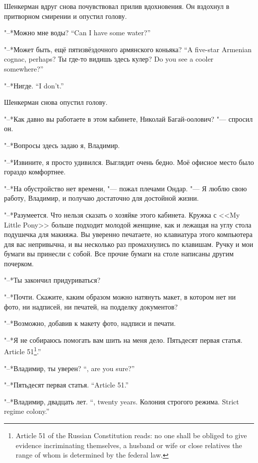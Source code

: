 Шенкерман вдруг снова почувствовал прилив вдохновения.
Он вздохнул в притворном смирении и опустил голову.

{"--*Можно мне воды?}
{``Can I have some water?''}

{"--*Может быть, ещё пятизвёздочного армянского коньяка?}
{``A five-star Armenian cognac, perhaps?}
{Ты где-то видишь здесь кулер?}
{Do you see a cooler somewhere?''}

{"--*Нигде.}
{``I don't.''}

Шенкерман снова опустил голову.

"--*Как давно вы работаете в этом кабинете, Николай Багай-оолович? "--- спросил он.

"--*Вопросы здесь задаю я, Владимир.

"--*Извините, я просто удивился.
Выглядит очень бедно.
Моё офисное место было гораздо комфортнее.

"--*На обустройство нет времени, "--- пожал плечами Ондар.
"--- Я люблю свою работу, Владимир, и получаю достаточно для достойной жизни.

"--*Разумеется.
Что нельзя сказать о хозяйке этого кабинета.
Кружка с <<My Little Pony>> больше подходит молодой женщине, как и лежащая на углу стола подушечка для макияжа.
Вы уверенно печатаете, но клавиатура этого компьютера для вас непривычна, и вы несколько раз промахнулись по клавишам.
Ручку и мои бумаги вы принесли с собой.
Все прочие бумаги на столе написаны другим почерком.

"--*Ты закончил придуриваться?

"--*Почти.
Скажите, каким образом можно натянуть макет, в котором нет ни фото, ни надписей, ни печатей, на подделку документов?

"--*Возможно, добавив к макету фото, надписи и печати.

"--*Я не собираюсь помогать вам шить на меня дело.
{Пятьдесят первая статья.}
{Article 51\footnote{Article 51 of the Russian Constitution reads: no one shall be obliged to give evidence incriminating themselves, a husband or wife or close relatives the range of whom is determined by the federal law.}.''}

{"--*Владимир, ты уверен?}
{``\Vladimir, are you sure?''}

{"--*Пятьдесят первая статья.}
{``Article 51.''}

{"--*Владимир, двадцать лет.}
{``\Vladimir, twenty years.}
{Колония строгого режима.}
{Strict regime colony.''}

